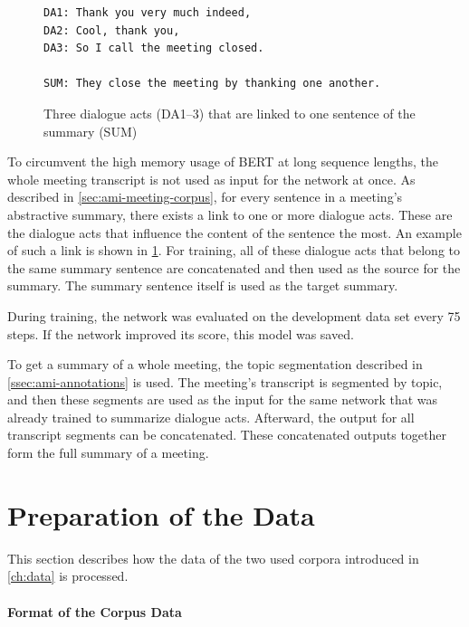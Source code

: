 \begin{figure}[h]
\begin{lstlisting}[numbers=none]
DA1: Thank you very much indeed,
DA2: Cool, thank you,
DA3: So I call the meeting closed.

SUM: They close the meeting by thanking one another.
\end{lstlisting}
\caption{Three dialogue acts (DA1--3) that are linked to one sentence of the summary (SUM)}
\label{fig:dialogue-arc-summary-link-example}
\end{figure}

To circumvent the high memory usage of BERT at long sequence lengths, the whole meeting transcript is not used as input for the network at once.
As described in \cref{sec:ami-meeting-corpus}, for every sentence in a meeting's abstractive summary, there exists a link to one or more dialogue acts.
These are the dialogue acts that influence the content of the sentence the most.
An example of such a link is shown in \cref{fig:dialogue-arc-summary-link-example}.
For training, all of these dialogue acts that belong to the same summary sentence are concatenated and then used as the source for the summary.
The summary sentence itself is used as the target summary.

During training, the network was evaluated on the development data set every 75 steps.
If the network improved its score, this model was saved.

To get a summary of a whole meeting, the topic segmentation described in \cref{ssec:ami-annotations} is used.
The meeting's transcript is segmented by topic, and then these segments are used as the input for the same network that was already trained to summarize dialogue acts.
Afterward, the output for all transcript segments can be concatenated.
These concatenated outputs together form the full summary of a meeting. 

\section{Preparation of the Data}\label{sec:preparation-of-the-data}

This section describes how the data of the two used corpora introduced in \cref{ch:data} is processed.

\paragraph{Format of the Corpus Data}

